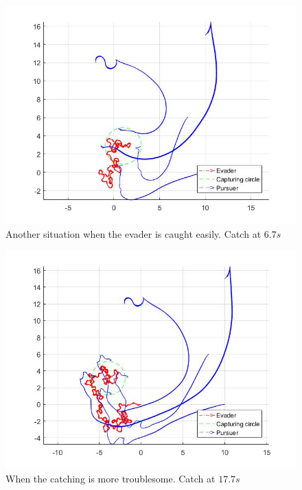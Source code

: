 \documentclass[ebook,11pt] {kth-mag}
\begin{document}
\begin{figure}[H]
\centering
\includegraphics[scale=0.35]{open_random_easy2}
\caption{Another situation when the evader is caught easily. Catch at $6.7 s$}
\end{figure}

\begin{figure}[H]
\centering
\includegraphics[scale=0.35]{open_random_medium}
\caption{When the catching is more troublesome. Catch at $17.7 s$}
\end{figure}
\end{document}
